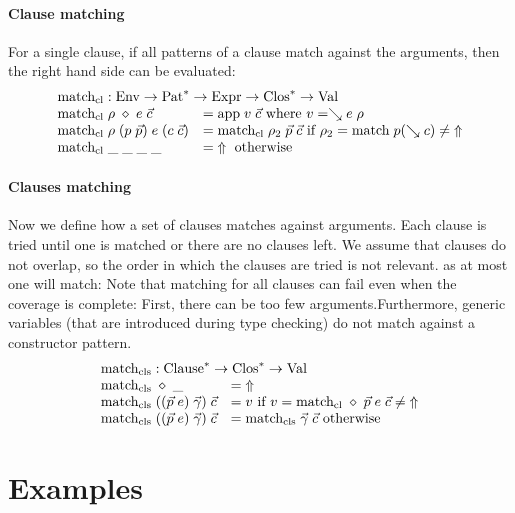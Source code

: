 \paragraph*{Clause matching}
For a single clause, if all patterns of a clause match against the arguments, then the right hand side can be evaluated: 
\[
\begin{array}{ll}
\multicolumn{2}{l}{\matchcl : \Env \ra \ves{\Pat} \ra \Expr \ra \ves{\Clos} \ra \Val}\\
\matchcl \; \rho \; \diamond \; e \; \vec{c} & = \ap \; v \; \vec{c} \mbox{ where } v = \wh e \; \rho \\

\matchcl \; \rho \; (p \; \vec{p}) \; e \; (c \; \vec{c}) & = \matchcl \; \rho_2 \; \vec{p} \; \vec{c} \mbox{ if } \rho_2 = \match \; p (\wh c) \neq \stuck \\  
\matchcl \; \_ \; \_\; \_ \; \_ & = \stuck \mbox{ otherwise}\\  
\end{array}
\]

\paragraph*{Clauses matching} 
Now we define how a set of clauses matches against arguments. 
Each clause is tried until one is matched or there are no clauses left. We assume that clauses do not overlap, so the order in which the clauses are tried is not relevant. as at most one will match:
Note that matching for all clauses can fail even when the coverage is complete: First, there can be too few arguments.Furthermore, generic variables (that are introduced during type checking) do not match against a constructor pattern. 
\[
\begin{array}{ll}
\multicolumn{2}{l}{\matchcls : \ves{\Clause} \ra \ves{\Clos} \ra \Val}\\
\matchcls \; \diamond \; \_ & = \stuck \\
\matchcls \;  ((\vec{p} \; e)\;\vec{\gamma}) \; \vec{c} & = v \mbox{ if } v = \matchcl \; \diamond \; \vec{p} \; e \;  \vec{c} \neq \stuck \\
\matchcls \; ((\vec{p} \; e)\;\vec{\gamma}) \; \vec{c} & = \matchcls \; \vec{\gamma} \; \vec{c} \mbox{ otherwise}  
\end{array}
\]


\section{Examples}
